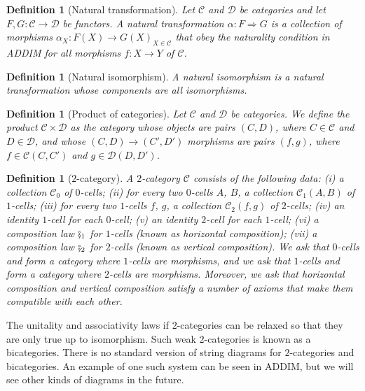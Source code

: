 \documentclass[11pt,a4paper,openright,twoside]{report}
\theoremstyle{plain}
\newtheorem{definition}[proposition]{Definition}
\theoremstyle{definition}
\begin{document}
\begin{definition}[Natural transformation]
  Let $\mathcal{C}$ and $\mathcal{D}$ be categories and let $F,G: \mathcal{C} \to \mathcal{D}$ be functors. A natural transformation $\alpha: F \Rightarrow G$ is a collection of morphisms ${\alpha_X: F(X) \to G(X)}_{X \in \mathcal{C}}$ that obey the naturality condition in ADDIM for all morphisms $f: X \to Y$ of $\mathcal{C}$.
\end{definition}

\begin{definition}[Natural isomorphism]
  A natural isomorphism is a natural transformation whose components are all isomorphisms.
\end{definition}

\begin{definition}[Product of categories]
  Let $\mathcal{C}$ and $\mathcal{D}$ be categories. We define the product $\mathcal{C} \times \mathcal{D}$ as the category whose objects are pairs $(C,D)$, where $C \in \mathcal{C}$ and $D \in \mathcal{D}$, and whose $(C,D) \to (C',D')$ morphisms are pairs $(f,g)$, where $f \in \mathcal{C}(C,C')$ and $g \in \mathcal{D}(D,D')$. 
\end{definition}

\begin{definition}[$2$-category]
  A $2$-category $\mathcal{C}$ consists of the following data: (i) a collection $\mathcal{C}_0$ of $0$-cells; (ii) for every two $0$-cells $A$, $B$, a collection $\mathcal{C}_1(A,B)$ of $1$-cells;  (iii) for every two $1$-cells $f$, $g$, a collection $\mathcal{C}_2(f,g)$ of $2$-cells; (iv) an identity $1$-cell for each $0$-cell; (v) an identity $2$-cell for each $1$-cell; (vi) a composition law $\fatsemi_1$ for $1$-cells (known as horizontal composition); (vii) a composition law $\fatsemi_2$ for $2$-cells (known as vertical composition).
  We ask that $0$-cells and form a category where $1$-cells are morphisms, and we ask that $1$-cells and form a category where $2$-cells are morphisms. Moreover, we ask that horizontal composition and vertical composition satisfy a number of axioms that make them compatible with each other.
\end{definition}

The unitality and associativity laws if $2$-categories can be relaxed so that they are only true up to isomorphism. Such weak $2$-categories is known as a bicategories. There is no standard version of string diagrams for $2$-categories and bicategories. An example of one such system can be seen in ADDIM, but we will see other kinds of diagrams in the future.
\end{document}

